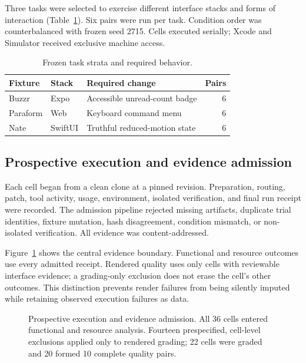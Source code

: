 \documentclass[9pt,twocolumn]{extarticle}
\begin{document}
Three tasks were selected to exercise different interface stacks and forms of
interaction (Table~\ref{tab:tasks}). Six pairs were run per task. Condition
order was counterbalanced with frozen seed 2715. Cells executed serially; Xcode
and Simulator received exclusive machine access.

\begin{table}[t]
\centering
\caption{Frozen task strata and required behavior.}
\label{tab:tasks}
\small
\begin{tabularx}{\columnwidth}{@{}p{}p{}Xr@{}}
\toprule
Fixture & Stack & Required change & Pairs \\
\midrule
Buzzr & Expo & Accessible unread-count badge & 6 \\
Paraform & Web & Keyboard command menu & 6 \\
Nate & SwiftUI & Truthful reduced-motion state & 6 \\
\bottomrule
\end{tabularx}
\end{table}

\subsection{Prospective execution and evidence admission}

Each cell began from a clean clone at a pinned revision. Preparation, routing,
patch, tool activity, usage, environment, isolated verification, and final run
receipt were recorded. The admission pipeline rejected missing artifacts,
duplicate trial identities, fixture mutation, hash disagreement, condition
mismatch, or non-isolated verification. All evidence was content-addressed.

Figure~\ref{fig:design} shows the central evidence boundary. Functional and
resource outcomes use every admitted receipt. Rendered quality uses only cells
with reviewable interface evidence; a grading-only exclusion does not erase
the cell's other outcomes. This distinction prevents render failures from being
silently imputed while retaining observed execution failures as data.

\begin{figure}[t]
\centering
\StudyDesignFigure
\caption{Prospective execution and evidence admission. All 36 cells entered
functional and resource analysis. Fourteen prespecified, cell-level exclusions
applied only to rendered grading; 22 cells were graded and 20 formed 10 complete
quality pairs.}
\label{fig:design}
\end{figure}
\end{document}
